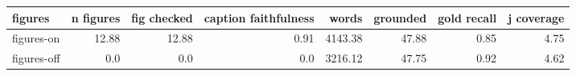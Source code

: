 \begin{tabular}{lrrrrrrr}
\toprule
figures & n figures & fig checked & caption faithfulness & words & grounded & gold recall & j coverage \\
\midrule
figures-on & 12.88 & 12.88 & 0.91 & 4143.38 & 47.88 & 0.85 & 4.75 \\
figures-off & 0.0 & 0.0 & 0.0 & 3216.12 & 47.75 & 0.92 & 4.62 \\
\bottomrule
\end{tabular}
